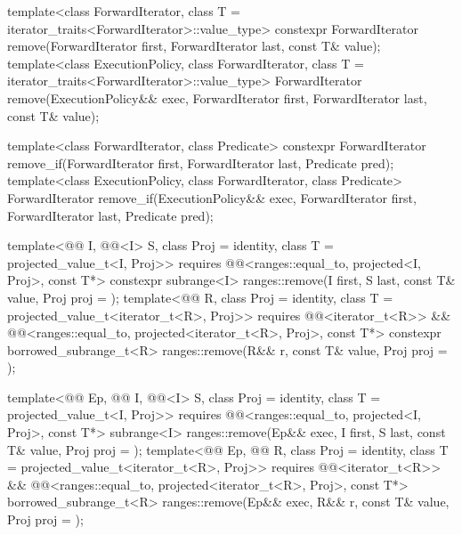 %
%
\begin{itemdecl}
template<class ForwardIterator, class T = iterator_traits<ForwardIterator>::value_type>
  constexpr ForwardIterator remove(ForwardIterator first, ForwardIterator last,
                                   const T& value);
template<class ExecutionPolicy, class ForwardIterator,
         class T = iterator_traits<ForwardIterator>::value_type>
  ForwardIterator remove(ExecutionPolicy&& exec,
                         ForwardIterator first, ForwardIterator last,
                         const T& value);

template<class ForwardIterator, class Predicate>
  constexpr ForwardIterator remove_if(ForwardIterator first, ForwardIterator last,
                                      Predicate pred);
template<class ExecutionPolicy, class ForwardIterator, class Predicate>
  ForwardIterator remove_if(ExecutionPolicy&& exec,
                            ForwardIterator first, ForwardIterator last,
                            Predicate pred);

template<@@ I, @@<I> S, class Proj = identity,
         class T = projected_value_t<I, Proj>>
  requires @@<ranges::equal_to, projected<I, Proj>, const T*>
  constexpr subrange<I> ranges::remove(I first, S last, const T& value, Proj proj = {});
template<@@ R, class Proj = identity,
         class T = projected_value_t<iterator_t<R>, Proj>>
  requires @@<iterator_t<R>> &&
           @@<ranges::equal_to, projected<iterator_t<R>, Proj>, const T*>
  constexpr borrowed_subrange_t<R>
    ranges::remove(R&& r, const T& value, Proj proj = {});

template<@@ Ep, @@ I, @@<I> S,
         class Proj = identity, class T = projected_value_t<I, Proj>>
  requires @@<ranges::equal_to, projected<I, Proj>, const T*>
  subrange<I>
    ranges::remove(Ep&& exec, I first, S last, const T& value, Proj proj = {});
template<@@ Ep, @@ R, class Proj = identity,
         class T = projected_value_t<iterator_t<R>, Proj>>
  requires @@<iterator_t<R>> &&
           @@<ranges::equal_to,
                                      projected<iterator_t<R>, Proj>, const T*>
  borrowed_subrange_t<R>
    ranges::remove(Ep&& exec, R&& r, const T& value, Proj proj = {});


\end{itemdecl}
